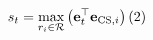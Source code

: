 \documentclass[preview,border=3pt]{standalone}
\begin{document}
\begin{minipage}{3.42in}
\fontsize{12.5pt}{15.5pt}\selectfont
\begin{equation*}
s_t = \max_{r_i \in \mathcal{R}} \left(\mathbf{e}_t^\top \mathbf{e}_{\mathrm{CS}, i}\right) \hfill (2)
\end{equation*}
\end{minipage}
\end{document}
